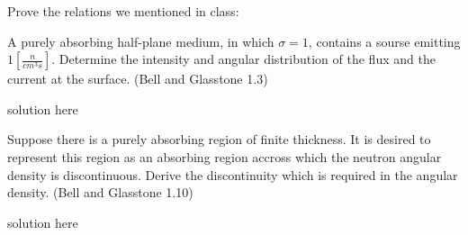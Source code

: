 \documentclass[12pts,answers]{exam}
\begin{document}
\begin{questions}
        \question Prove the relations we mentioned in class:


        \question[40] A purely absorbing half-plane medium, in which $\sigma = 1$, 
        contains a sourse emitting $1\left[\frac{n}{cm^3s}\right]$. Determine 
                the intensity and angular distribution of the flux and the 
                current at the surface. (Bell and Glasstone 1.3)
        \begin{solution}
                solution here
        \end{solution}

        \question[45] Suppose there is a purely absorbing region of finite 
        thickness. It is desired to represent this region as an absorbing 
        region accross which the neutron angular density is discontinuous. 
        Derive the discontinuity which is required in the angular density. 
        (Bell and Glasstone 1.10)
        \begin{solution}
                solution here
        \end{solution}

\end{questions}



%
%
\end{document}
